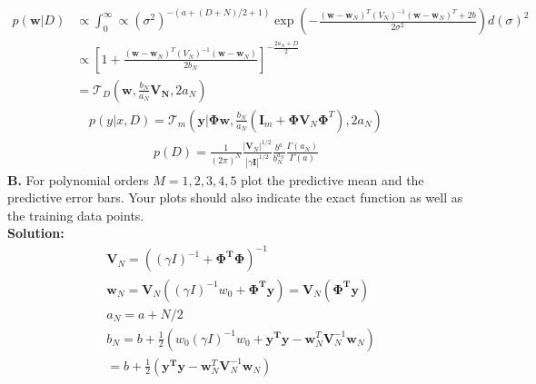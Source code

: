\documentclass{article}
\begin{document}
\begin{equation}
\begin{aligned}
    p(\mathbf{w}|D) & \propto \int_{0}^{\infty} \propto (\sigma^2)^{-(a+(D+N)/2+1)} \exp \left( -\frac{(\mathbf{w} - \mathbf{w}_{N})^{T}(V_{N})^{-1} (\mathbf{w} - \mathbf{w}_{N})^{T}+2b}{2\sigma^2}\right) d(\sigma)^2 \\
    & \propto \left[1+\frac{(\mathbf{w} - \mathbf{w}_{N})^{T}(V_{N})^{-1} (\mathbf{w}-\mathbf{w}_{N})}{2b_{N}} \right]^{ - \frac{2a_{N}+D}{2}} \\
    & = \mathcal{T}_{D} (\mathbf{w}, \frac{b_{N}}{a_{N}}\mathbf{V_{N}},2a_{N})
\end{aligned}
\end{equation}
\newpage
\begin{equation}
\begin{aligned}
    p(y|x,D) = \mathcal{T}_{m} (\mathbf{y} | \mathbf{\Phi}\mathbf{w}, \frac{b_{N}}{a_{N}}(\mathbf{I}_{m}+\mathbf{\Phi} \mathbf{V}_{N} \mathbf{\Phi}^{T}),2a_{N})
\end{aligned}
\end{equation}
\newpage
\begin{equation}
\begin{aligned}
    p(D) = \frac{1}{(2\pi)^{N}} \frac{|\mathbf{V}_{N}|^{1/2}}{|\gamma \mathbf{I}|^{1/2}} \frac{b^a}{b_{N}^{a_{N}}} \frac{\Gamma(a_{N})}{\Gamma(a)}
\end{aligned}
\end{equation}
\newpage
\textbf{B.} For polynomial orders $M = 1,2,3,4,5$ plot the predictive mean and the predictive error bars. Your plots should also indicate the exact function as well as the training data points. \\
\textbf{Solution:} \\
\begin{equation}
\begin{aligned}
& \mathbf{V}_{N} = ((\gamma I)^{-1} + \mathbf{\Phi^{T}\Phi} )^{-1} \\
& \mathbf{w}_{N} = \mathbf{V}_{N} ((\gamma I)^{-1} w_{0} + \mathbf{\Phi^{T}y})  =\mathbf{V}_{N} ( \mathbf{\Phi^{T}y}) \\
& a_{N} = a + N/2 \\
& b_{N} = b + \frac{1}{2} (w_{0}(\gamma I)^{-1}w_{0} + \mathbf{y^{T}y} - \mathbf{w}_{N}^{T} \mathbf{V}_{N} ^{-1} \mathbf{w}_{N}) \\ 
& = b + \frac{1}{2} ( \mathbf{y^{T}y} - \mathbf{w}_{N}^{T} \mathbf{V}_{N} ^{-1} \mathbf{w}_{N})
\end{aligned}
\end{equation}
\end{document}
